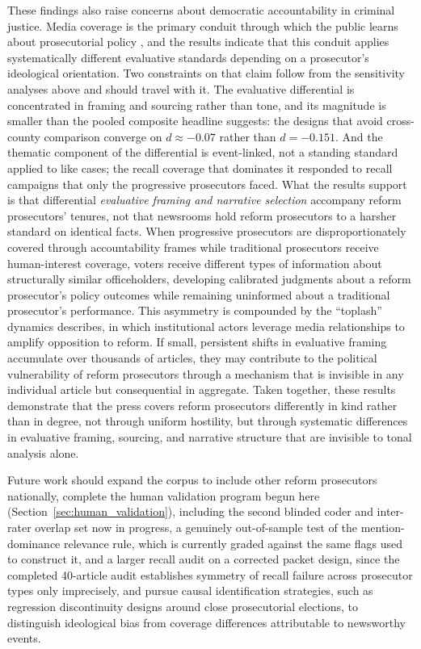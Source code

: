 \documentclass[12pt, letterpaper]{article}
\begin{document}
These findings also raise concerns about democratic accountability in criminal justice. Media coverage is the primary conduit through which the public learns about prosecutorial policy \citep{wright2009}, and the results indicate that this conduit applies systematically different evaluative standards depending on a prosecutor's ideological orientation. Two constraints on that claim follow from the sensitivity analyses above and should travel with it. The evaluative differential is concentrated in framing and sourcing rather than tone, and its magnitude is smaller than the pooled composite headline suggests: the designs that avoid cross-county comparison converge on $d \approx -0.07$ rather than $d = -0.151$. And the thematic component of the differential is event-linked, not a standing standard applied to like cases; the recall coverage that dominates it responded to recall campaigns that only the progressive prosecutors faced. What the results support is that differential \emph{evaluative framing and narrative selection} accompany reform prosecutors' tenures, not that newsrooms hold reform prosecutors to a harsher standard on identical facts. When progressive prosecutors are disproportionately covered through accountability frames while traditional prosecutors receive human-interest coverage, voters receive different types of information about structurally similar officeholders, developing calibrated judgments about a reform prosecutor's policy outcomes while remaining uninformed about a traditional prosecutor's performance. This asymmetry is compounded by the ``toplash'' dynamics \citet{goldstein2024} describes, in which institutional actors leverage media relationships to amplify opposition to reform. If small, persistent shifts in evaluative framing accumulate over thousands of articles, they may contribute to the political vulnerability of reform prosecutors through a mechanism that is invisible in any individual article but consequential in aggregate. Taken together, these results demonstrate that the press covers reform prosecutors differently in kind rather than in degree, not through uniform hostility, but through systematic differences in evaluative framing, sourcing, and narrative structure that are invisible to tonal analysis alone.

Future work should expand the corpus to include other reform prosecutors nationally, complete the human validation program begun here (Section~\ref{sec:human_validation}), including the second blinded coder and inter-rater overlap set now in progress, a genuinely out-of-sample test of the mention-dominance relevance rule, which is currently graded against the same flags used to construct it, and a larger recall audit on a corrected packet design, since the completed 40-article audit establishes symmetry of recall failure across prosecutor types only imprecisely, and pursue causal identification strategies, such as regression discontinuity designs around close prosecutorial elections, to distinguish ideological bias from coverage differences attributable to newsworthy events.
\end{document}
